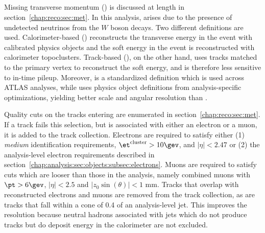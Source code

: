 \subsection{\etmiss}

Missing transverse momentum (\etmiss) is discussed at length in
section~\ref{chap:reco:sec:met}. In this analysis, \etmiss
arises due to the presence of undetected neutrinos from the $W$ boson
decays. Two different \etmiss definitions are used. Calorimeter-based
\etmiss (\calomet) reconstructs the transverse energy in the event
with calibrated physics objects and the soft energy in the event is
reconstructed with calorimeter topoclusters. Track-based \etmiss (\trkmet), on
the other hand, uses tracks matched to the primary vertex to
reconstruct the soft energy, and is therefore less sensitive to
in-time pileup. Moreover, \calomet is a standardized
definition which is used across ATLAS analyses, while \trkmet uses
physics object definitions from analysis-specific optimizations,
yielding better scale and angular resolution than \calomet. 

Quality cuts on the tracks entering \trkmet are enumerated in
section~\ref{chap:reco:sec:met}. If a track fails this selection, but
is associated with either an electron or a muon, it is added to the
track collection. Electrons are required to satisfy either (1) {\it
  medium} identification requirements, $\et^{\textrm{cluster}} > 10
\gev$, and $|\eta| < 2.47$ or (2) the analysis-level electron
requirements described in
section~\ref{chap:analysis:sec:objects:subsec:electrons}. Muons are
required to satisfy cuts which are looser than those in the analysis,
namely combined muons with $\pt > 6 \gev$, $|\eta| < 2.5$ and
$|z_0\sin (\theta)| < 1$ mm. Tracks that overlap with reconstructed
electrons and muons are removed from the track collection, as are tracks
that fall within a cone of 0.4 of an analysis-level jet. This improves
the \etmiss resolution because neutral hadrons associated with jets which do
not produce tracks but do deposit energy in the calorimeter are not
excluded.


